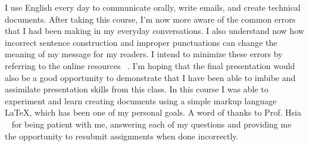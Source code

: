 \documentclass[letterpaper,12pt]{texMemo}
\begin{document}
\begin{singlespacing}
I use English every day to communicate orally, write emails, and create technical documents. After taking this course, I'm now more aware of the common errors that I had been making in my everyday conversations. I also understand now how incorrect sentence construction and improper punctuations can change the meaning of my message for my readers. I intend to minimize these errors by referring to the online resources ~\citep{PurdueOW20:online}. I'm hoping that the final presentation would also be a good opportunity to demonstrate that I have been able to imbibe and assimilate presentation skills from this class. In this course I was able to experiment and learn creating documents using a simple markup language \LaTeX{}, which has been one of my personal goals.
A word of thanks to Prof. Hsia ~\citep{BonnieHs13:online} for being patient with me, answering each of my questions and providing me the opportunity to resubmit assignments when done incorrectly.



\end{singlespacing}
\end{document}

